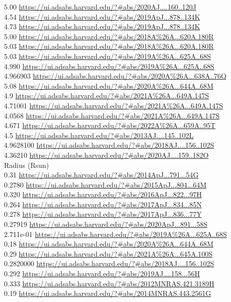 5.00 \url{https://ui.adsabs.harvard.edu/?#abs/2020AJ....160..120J}\\
4.54 \url{https://ui.adsabs.harvard.edu/?#abs/2019ApJ...878..134K}\\
4.73 \url{https://ui.adsabs.harvard.edu/?#abs/2019ApJ...878..134K}\\
5.00 \url{https://ui.adsabs.harvard.edu/?#abs/2018A%26A...620A.180R}\\
5.03 \url{https://ui.adsabs.harvard.edu/?#abs/2018A%26A...620A.180R}\\
5.03 \url{https://ui.adsabs.harvard.edu/?#abs/2019A%26A...625A..68S}\\
4.990 \url{https://ui.adsabs.harvard.edu/?#abs/2019A%26A...625A..68S}\\
4.966903 \url{https://ui.adsabs.harvard.edu/?#abs/2020A%26A...638A..76Q}\\
5.08 \url{https://ui.adsabs.harvard.edu/?#abs/2020A%26A...644A..68M}\\
4.9 \url{https://ui.adsabs.harvard.edu/?#abs/2021A%26A...649A.147S}\\
4.71001 \url{https://ui.adsabs.harvard.edu/?#abs/2021A%26A...649A.147S}\\
4.0568 \url{https://ui.adsabs.harvard.edu/?#abs/2021A%26A...649A.147S}\\
4.671 \url{https://ui.adsabs.harvard.edu/?#abs/2022A%26A...659A..95T}\\
4.5 \url{https://ui.adsabs.harvard.edu/?#abs/2013AJ....145..102L}\\
4.9628100 \url{https://ui.adsabs.harvard.edu/?#abs/2018AJ....156..102S}\\
4.36210 \url{https://ui.adsabs.harvard.edu/?#abs/2020AJ....159..182O}\\

Radius (Rsun)\\
0.31 \url{https://ui.adsabs.harvard.edu/?#abs/2014ApJ...791...54G}\\
0.2780 \url{https://ui.adsabs.harvard.edu/?#abs/2015ApJ...804...64M}\\
0.320 \url{https://ui.adsabs.harvard.edu/?#abs/2016ApJ...822...97H}\\
0.264 \url{https://ui.adsabs.harvard.edu/?#abs/2017ApJ...834...85N}\\
0.278 \url{https://ui.adsabs.harvard.edu/?#abs/2017ApJ...836...77Y}\\
0.27919 \url{https://ui.adsabs.harvard.edu/?#abs/2020ApJ...891...58S}\\
2.711e-01	\url{https://ui.adsabs.harvard.edu/?#abs/2019A%26A...625A..68S}\\
0.18 \url{https://ui.adsabs.harvard.edu/?#abs/2020A%26A...644A..68M}\\
0.29 \url{https://ui.adsabs.harvard.edu/?#abs/2021A%26A...645A.100S}\\
0.2820000 \url{https://ui.adsabs.harvard.edu/?#abs/2018AJ....156..102S}\\
0.292 \url{https://ui.adsabs.harvard.edu/?#abs/2019AJ....158...56H}\\
0.333 \url{https://ui.adsabs.harvard.edu/?#abs/2012MNRAS.421.3189H}\\
0.19 \url{https://ui.adsabs.harvard.edu/?#abs/2014MNRAS.443.2561G}\\